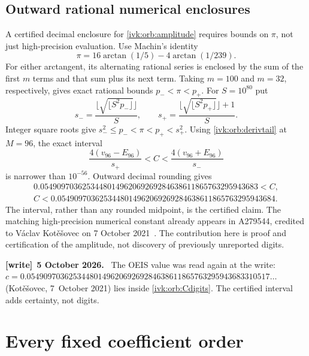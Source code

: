 \documentclass[11pt,letterpaper]{article}
\theoremstyle{remark}\newtheorem{remark}[theorem]{Remark}
\newenvironment{writenote}[1][]{\par\smallskip\begingroup\small
 \noindent\textbf{[write]}\if\relax\detokenize{#1}\relax\else~\textbf{#1.}\fi\ }%
 {\par\endgroup\smallskip}
\begin{document}
\subsection{Outward rational numerical enclosures}
A certified decimal enclosure for \eqref{ivk:orb:amplitude} requires bounds
on $\pi$, not just high-precision evaluation. Use Machin's identity
\[
\pi=16\arctan(1/5)-4\arctan(1/239).
\]
For either arctangent, its alternating rational series is enclosed by
the sum of the first $m$ terms and that sum plus its next term.
Taking $m=100$ and $m=32$, respectively, gives exact rational bounds
$p_-<\pi<p_+$. For $S=10^{80}$ put
\[
s_- =\frac{\lfloor\sqrt{\lfloor S^2p_-\rfloor}\rfloor}{S},
\qquad
s_+ =\frac{\lfloor\sqrt{\lfloor S^2p_+\rfloor}\rfloor+1}{S}.
\]
Integer square roots give $s_-^2\le p_-<\pi<p_+<s_+^2$.
Using \eqref{ivk:orb:derivtail} at $M=96$, the exact interval
\[
\frac{4(v_{96}-E_{96})}{s_+}<C<
\frac{4(v_{96}+E_{96})}{s_-}
\]
is narrower than $10^{-56}$. Outward decimal rounding gives
\begin{equation}\label{ivk:orb:Cdigits}
\begin{gathered}
0.0549097036253448014962069269284638611865763295943683<C,\\
C<0.0549097036253448014962069269284638611865763295943684.
\end{gathered}
\end{equation}
The interval, rather than any rounded midpoint, is the certified claim.
The matching high-precision numerical constant already appears in
A279544, credited to V\'aclav Kot\v{e}\v{s}ovec on 7 October
2021~\cite{oeis214}. The contribution here is proof and certification
of the amplitude, not discovery of previously unreported digits.
\begin{writenote}[5 October 2026]
The OEIS value was read again at the write: $c=0.0549097036253448014962\allowbreak069269284638611865763295\allowbreak943683310517\ldots$ (Kot\v{e}\v{s}ovec, 7~October 2021) lies inside \eqref{ivk:orb:Cdigits}. The certified interval adds certainty, not digits.
\end{writenote}


\section{Every fixed coefficient order}
\end{document}
